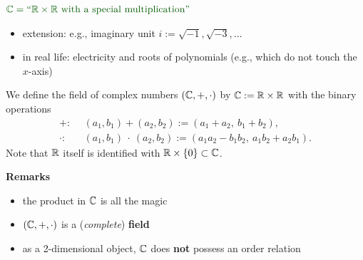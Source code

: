 \begin{frame}
\vspace{0.5cm}
$\color{defgruen} \C = \text{``}\R \times \R~ \text{with a special multiplication''}$
\vspace{0.5cm}
\begin{itemize}
	\item extension: e.g., imaginary unit $i :=\sqrt{-1}, \sqrt{-3},\ldots$ \vspace{0.2cm}
	\item in real life: electricity and roots of polynomials (e.g., which do not touch the $x$-axis)
\end{itemize}
\begin{defi} We define the field of complex numbers $({\mathbb{C}},+,\cdot)$ by ${\mathbb{C}}:={\mathbb{R}}\times{\mathbb{R}}$ with the binary operations
	\begin{align*}
	+:&~~ (a_1,b_1)+(a_2,b_2):=(a_1+a_2,~b_1+b_2),\\
	\cdot:&~~ (a_1,b_1)~\cdot~(a_2,b_2):=(a_1a_2-b_1b_2,~a_1b_2+a_2b_1).
	\end{align*} 
	Note that ${\mathbb{R}}$ itself is identified with ${\mathbb{R}}\times\{0\}\subset{\mathbb{C}}$.
\end{defi}
\vspace{0.4cm}

\textbf{Remarks}
\begin{itemize}
	\item the product in ${\mathbb{C}}$ is all the magic \vspace{0.2cm}
	\item  $({\mathbb{C}},+, \cdot)$ is a (\textit{complete}) \textbf{field} \vspace{0.2cm}
	\item  as a 2-dimensional object, ${\mathbb{C}}$ does \textbf{not} possess an order relation
\end{itemize}



\end{frame}


